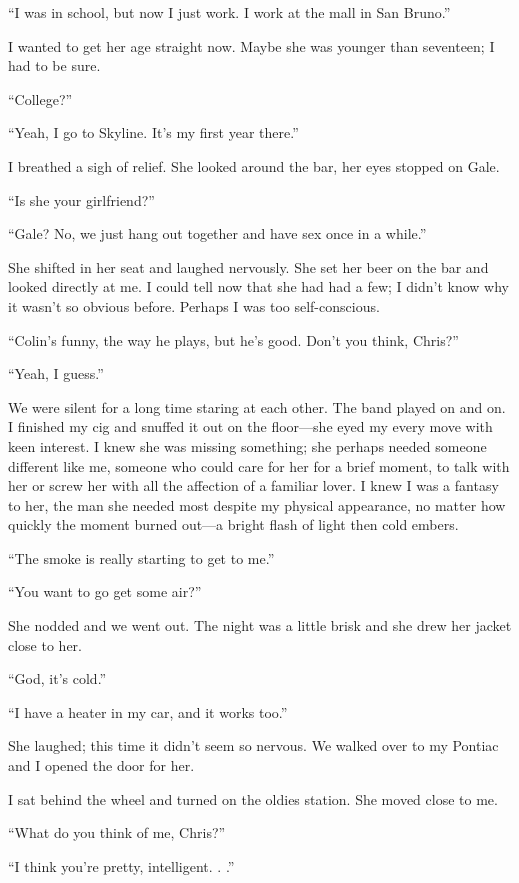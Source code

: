 ``I was in school, but now I just work. I work at the mall in San
Bruno.''

I wanted to get her age straight now. Maybe she was younger than
seventeen; I had to be sure.

``College?''

``Yeah, I go to Skyline. It's my first year there.''

I breathed a sigh of relief. She looked around the bar, her eyes stopped
on Gale.

``Is she your girlfriend?''

``Gale? No, we just hang out together and have sex once in a while.''

She shifted in her seat and laughed nervously. She set her beer on the
bar and looked directly at me. I could tell now that she had had a few;
I didn't know why it wasn't so obvious before. Perhaps I was too
self-conscious.

``Colin's funny, the way he plays, but he's good. Don't you think,
Chris?''

``Yeah, I guess.''

We were silent for a long time staring at each other. The band played on
and on. I finished my cig and snuffed it out on the floor---she eyed my
every move with keen interest. I knew she was missing something; she
perhaps needed someone different like me, someone who could care for her
for a brief moment, to talk with her or screw her with all the affection
of a familiar lover. I knew I was a fantasy to her, the man she needed
most despite my physical appearance, no matter how quickly the moment
burned out---a bright flash of light then cold embers.

``The smoke is really starting to get to me.''

``You want to go get some air?''

She nodded and we went out. The night was a little brisk and she drew
her jacket close to her.

``God, it's cold.''

``I have a heater in my car, and it works too.''

She laughed; this time it didn't seem so nervous. We walked over to my
Pontiac and I opened the door for her.

I sat behind the wheel and turned on the oldies station. She moved close
to me.

``What do you think of me, Chris?''

``I think you're pretty, intelligent. . .''

